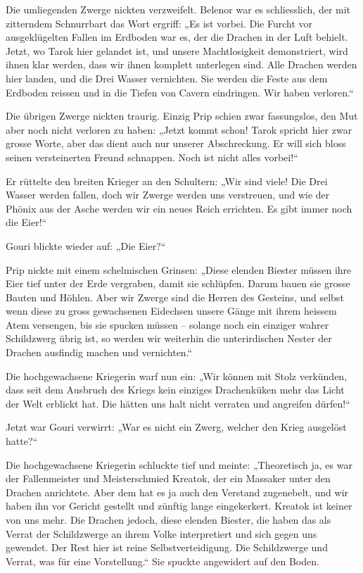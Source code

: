 Die umliegenden Zwerge nickten verzweifelt. Belenor war es schliesslich, der mit zitterndem Schnurrbart das Wort ergriff: „Es ist vorbei. Die Furcht vor ausgeklügelten Fallen im Erdboden war es, der die Drachen in der Luft behielt. Jetzt, wo Tarok hier gelandet ist, und unsere Machtlosigkeit demonstriert, wird ihnen klar werden, dass wir ihnen komplett unterlegen sind. Alle Drachen werden hier landen, und die Drei Wasser vernichten. Sie werden die Feste aus dem Erdboden reissen und in die Tiefen von Cavern eindringen. Wir haben verloren.“

Die übrigen Zwerge nickten traurig. Einzig Prip schien zwar fassungslos, den Mut aber noch nicht verloren zu haben: „Jetzt kommt schon! Tarok spricht hier zwar grosse Worte, aber das dient auch nur unserer Abschreckung. Er will sich bloss seinen versteinerten Freund schnappen. Noch ist nicht alles vorbei!“

Er rüttelte den breiten Krieger an den Schultern: „Wir sind viele! Die Drei Wasser werden fallen, doch wir Zwerge werden uns verstreuen, und wie der Phönix aus der Asche werden wir ein neues Reich errichten. Es gibt immer noch die Eier!“

Gouri blickte wieder auf: „Die Eier?“

Prip nickte mit einem schelmischen Grinsen: „Diese elenden Biester müssen ihre Eier tief unter der Erde vergraben, damit sie schlüpfen. Darum bauen sie grosse Bauten und Höhlen. Aber wir Zwerge sind die Herren des Gesteins, und selbst wenn diese zu gross gewachsenen Eidechsen unsere Gänge mit ihrem heissem Atem versengen, bis sie spucken müssen – solange noch ein einziger wahrer Schildzwerg übrig ist, so werden wir weiterhin die unterirdischen Nester der Drachen ausfindig machen und vernichten.“

Die hochgewachsene Kriegerin warf nun ein: „Wir können mit Stolz verkünden, dass seit dem Ausbruch des Kriegs kein einziges Drachenküken mehr das Licht der Welt erblickt hat. Die hätten uns halt nicht verraten und angreifen dürfen!“

Jetzt war Gouri verwirrt: „War es nicht ein Zwerg, welcher den Krieg ausgelöst hatte?“

Die hochgewachsene Kriegerin schluckte tief und meinte: „Theoretisch ja, es war der Fallenmeister und Meisterschmied Kreatok, der ein Massaker unter den Drachen anrichtete. Aber dem hat es ja auch den Verstand zugenebelt, und wir haben ihn vor Gericht gestellt und zünftig lange eingekerkert. Kreatok ist keiner von uns mehr. Die Drachen jedoch, diese elenden Biester, die haben das als Verrat der Schildzwerge an ihrem Volke interpretiert und sich gegen uns gewendet. Der Rest hier ist reine Selbstverteidigung. Die Schildzwerge und Verrat, was für eine Vorstellung.“ Sie spuckte angewidert auf den Boden.


